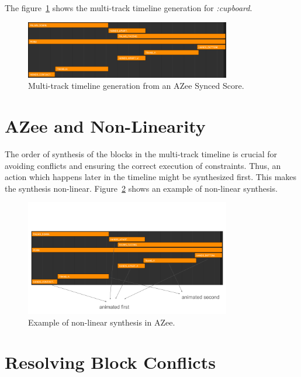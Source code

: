 \documentclass[../../main.tex]{subfiles}
\begin{document}
The figure~\ref{fig:azee_timeline} shows the multi-track timeline generation for \emph{:cupboard}.

\begin{figure}[h]
    \centering
    \includegraphics[width=0.8\textwidth]{chapters/multi_track/images/azee_timeline.png}
    \caption{Multi-track timeline generation from an AZee Synced Score.}
    \label{fig:azee_timeline}
\end{figure}

\section{AZee and Non-Linearity}
\label{ch:multi_track:azee_nl}

The order of synthesis of the blocks in the multi-track timeline is crucial for avoiding conflicts and ensuring the correct execution of constraints. Thus, an action which happens later in the timeline might be synthesized first. This makes the synthesis non-linear. Figure~\ref{fig:example_azee_non_linear} shows an example of non-linear synthesis.

\begin{figure}[h]
    \centering
    \includegraphics[width=0.8\textwidth]{chapters/multi_track/images/example_azee_non_linear.png}
    \caption{Example of non-linear synthesis in AZee.}
    \label{fig:example_azee_non_linear}
\end{figure}

\section{Resolving Block Conflicts}
\label{ch:multi_track:resolve_conflitcs}
\end{document}
